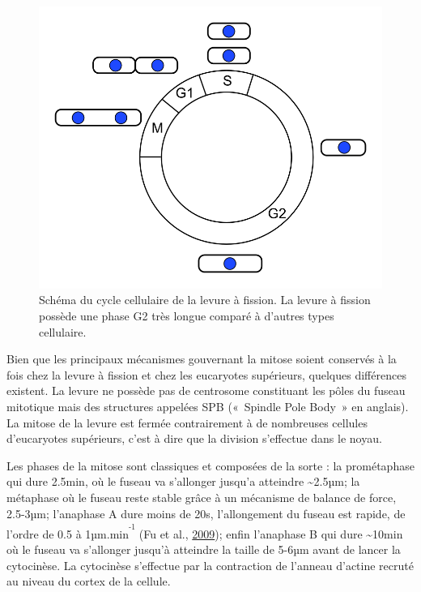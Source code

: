 \documentclass[12pt,a4paper,twoside,openright]{book}
\begin{document}
\begin{figure}[htbp]
\centering
\includegraphics{figures/intro/pombe_cell_cycle.png}
\caption[Schéma du cycle cellulaire de la levure à fission]{\label{fig:pombe-cell-cycle}Schéma
du cycle cellulaire de la levure à fission. La levure à fission possède
une phase G2 très longue comparé à d'autres types cellulaire.}
\end{figure}

Bien que les principaux mécanismes gouvernant la mitose soient conservés
à la fois chez la levure à fission et chez les eucaryotes supérieurs,
quelques différences existent. La levure ne possède pas de centrosome
constituant les pôles du fuseau mitotique mais des structures appelées
SPB («~Spindle Pole Body~» en anglais). La mitose de la levure est
fermée contrairement à de nombreuses cellules d'eucaryotes supérieurs,
c'est à dire que la division s'effectue dans le noyau.

Les phases de la mitose sont classiques et composées de la sorte : la
prométaphase qui dure 2.5min, où le fuseau va s'allonger jusqu'a
atteindre \textasciitilde{}2.5µm; la métaphase où le fuseau reste stable
grâce à un mécanisme de balance de force, 2.5-3µm; l'anaphase A dure
moins de 20s, l'allongement du fuseau est rapide, de l'ordre de 0.5 à
1µm.min\textsuperscript{\textsuperscript{-1}} (Fu et al.,
\protect\hyperlink{ref-Fu2009}{2009}); enfin l'anaphase B qui dure
\textasciitilde{}10min où le fuseau va s'allonger jusqu'à atteindre la
taille de 5-6µm avant de lancer la cytocinèse. La cytocinèse s'effectue
par la contraction de l'anneau d'actine recruté au niveau du cortex de
la cellule.
\end{document}
